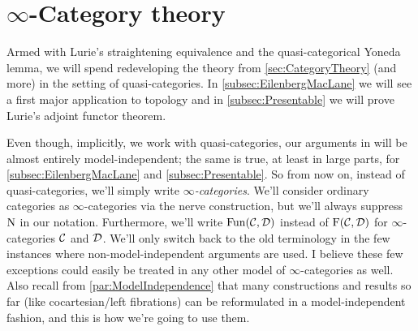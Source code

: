 	\section{\texorpdfstring{$\infty$}{Infinity}-Category theory}\label{sec:InftyCategoryTheory}

Armed with Lurie's straightening equivalence and the quasi-categorical Yoneda lemma, we will spend  redeveloping the theory from \cref{sec:CategoryTheory} (and more) in the setting of quasi-categories. In \cref{subsec:EilenbergMacLane} we will see a first major application to topology and in \cref{subsec:Presentable} we will prove Lurie's adjoint functor theorem.

Even though, implicitly, we work with quasi-categories, our arguments in  will be almost entirely model-independent; the same is true, at least in large parts, for \cref{subsec:EilenbergMacLane} and \cref{subsec:Presentable}. So from now on, instead of quasi-categories, we'll simply write \emph{$\infty$-categories}. We'll consider ordinary categories as $\infty$-categories via the nerve construction, but we'll always suppress $\operatorname{N}$ in our notation. Furthermore, we'll write $\operatorname{Fun}(\mathcal{C},\mathcal{D})$ instead of $\operatorname{F}(\mathcal{C},\mathcal{D})$ for $\infty$-categories $\mathcal{C}$ and $\mathcal{D}$. We'll only switch back to the old terminology in the few instances where non-model-independent arguments are used. I believe these few exceptions could easily be treated in any other model of $\infty$-categories as well. Also recall from \cref{par:ModelIndependence} that many constructions and results so far (like cocartesian/left fibrations) can be reformulated in a model-independent fashion, and this is how we're going to use them.
%
%

